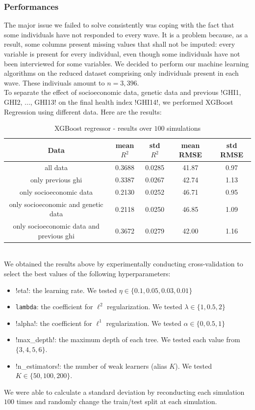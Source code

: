 \documentclass[]{article}
\begin{document}
\subsubsection{Performances}
\label{xgboost_performances}
The major issue we failed to solve consistently was coping with the fact that some individuals have not responded to every wave. It is a problem because, as a result, some columns present missing values that shall not be imputed: every variable is present for every individual, even though some individuals have not been interviewed for some variables. We decided to perform our machine learning algorithms on the reduced dataset comprising only individuals present in each wave. These indiviuals amount to $n = 3,396$.\\

\noindent
To separate the effect of socioeconomic data, genetic data and previous \pyth!GHI1, GHI2, ..., GHI13! on the final health index \pyth!GHI14!, we performed XGBoost Regression using different data. Here are the results:
\begin{table}[!h]
\centering
\begin{tabular}{|c|c|c|c|c|}
	\hline
	\textbf{Data} & \textbf{mean $R^2$} & \textbf{std $R^2$} & \textbf{mean RMSE} & \textbf{std RMSE}\\
	\hline
	all data & 0.3688 & 0.0285 & 41.87 & 0.97 \\ 
	\hline
	only previous ghi & 0.3387 & 0.0267 & 42.74 & 1.13\\
	\hline 
	only socioeconomic data & 0.2130 &0.0252 & 46.71 & 0.95\\
	\hline 
	only socioeconomic and genetic data & 0.2118 & 0.0250 & 46.85 & 1.09\\
	\hline 
	only socioeconomic data and previous ghi & 0.3672 &	0.0279 & 42.00 & 1.16\\
	\hline 
\end{tabular}
\caption{XGBoost regressor - results over $100$ simulations}
\label{results_xgbregressor}
\end{table}\\
We obtained the results above by experimentally conducting cross-validation to select the best values of the following hyperparameters:
\begin{itemize}
	\item \pyth!eta!: the learning rate. We tested $\eta \in \{0.1, 0.05, 0.03, 0.01\}$
	\item \texttt{lambda}: the coefficient for $\ell^2$ regularization. We tested $\lambda \in \{1, 0.5, 2\}$
	\item \pyth!alpha!: the coefficient for $\ell^1$ regularization. We tested $\alpha \in \{0, 0.5, 1\}$
	\item \pyth!max_depth!: the maximum depth of each tree. We tested each value from $\{3, 4, 5, 6\}$.
	\item \pyth!n_estimators!: the number of weak learners (alias $K$). We tested $K\in \{50, 100, 200\}$.
\end{itemize}
We were able to calculate a standard deviation by reconducting each simulation $100$ times and randomly change the train/test split at each simulation.\\
\end{document}
